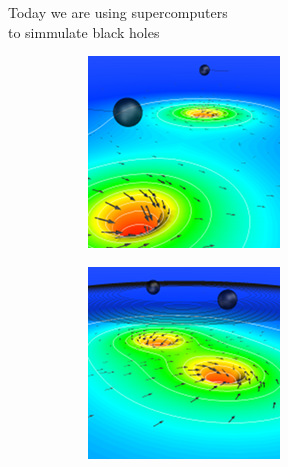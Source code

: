 \documentclass[xcolor={dvipsnames}]{beamer}
\begin{document}
\begin{frame}{Today we are using supercomputers\\ to simmulate black holes}{}
\begin{figure}[H]
\centering
\begin{subfigure}{.24\textwidth}
	\centering
	\includegraphics[width=\linewidth]{spec01}
\end{subfigure}
\begin{subfigure}{.24\textwidth}
	\centering
	\includegraphics[width=\linewidth]{spec02}

\end{subfigure}
\end{figure}
\end{frame}
\end{document}
